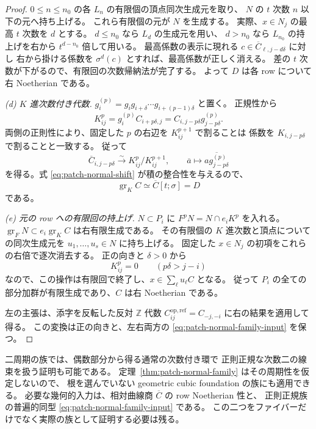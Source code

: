 \begin{proof}
$0\leq n\leq n_0$ の各 $L_n$ の有限個の頂点同次生成元を取り、
$N$ の $t$ 次数 $n$ 以下の元へ持ち上げる。
これら有限個の元が $N$ を生成する。
実際、$x\in N_j$ の最高 $t$ 次数を $d$ とする。
$d\leq n_0$ なら $L_d$ の生成元を用い、
$d>n_0$ なら $L_{n_0}$ の持上げを右から $t^{d-n_0}$ 倍して用いる。
最高係数の表示に現れる $c\in\overline C_{\ell,j-d\delta}$ に対し
右から掛ける係数を $\sigma^d(c)$ とすれば、最高係数が正しく消える。
差の $t$ 次数が下がるので、有限回の次数帰納法が完了する。
よって $D$ は各 row について右 Noetherian である。

\emph{(d) $K$ 進次数付き代数.}
$g_i^{(p)}=g_i g_{i+\delta}\cdots g_{i+(p-1)\delta}$ と置く。
正規性から
\[
 K^p_{ij}=g_i^{(p)}C_{i+p\delta,j}
          =C_{i,j-p\delta}g_{j-p\delta}^{(p)}.
\]
両側の正則性により、固定した $p$ の右辺を $K^{p+1}_{ij}$ で割ることは
係数を $K_{i,j-p\delta}$ で割ることと一致する。
従って
\[
 \overline C_{i,j-p\delta}\xrightarrow{\sim}
 K^p_{ij}/K^{p+1}_{ij},
 \qquad
 \overline a\longmapsto
 \overline{a g_{j-p\delta}^{(p)}}
\]
を得る。式 \eqref{eq:patch-normal-shift} が積の整合性を与えるので、
\[
 \operatorname{gr}_K C\simeq\overline C[t;\sigma]=D
\]
である。

\emph{(e) 元の row への有限回の持上げ.}
$N\subset P_i$ に $F^pN=N\cap e_iK^p$ を入れる。
$\operatorname{gr}_F N\subset e_i\operatorname{gr}_K C$ は右有限生成である。
その有限個の $K$ 進次数と頂点についての同次生成元を
$u_1,\ldots,u_s\in N$ に持ち上げる。
固定した $x\in N_j$ の初項をこれらの右倍で逐次消去する。
正の向きと $\delta>0$ から
\[
 K^p_{ij}=0\qquad(p\delta>j-i)
\]
なので、この操作は有限回で終了し、$x\in\sum_\ell u_\ell C$ となる。
従って $P_i$ の全ての部分加群が有限生成であり、$C$ は右 Noetherian である。

左の主張は、添字を反転した反対 $\mathbb Z$ 代数
$C^{\mathrm{op,ref}}_{ij}=C_{-j,-i}$ に右の結果を適用して得る。
この変換は正の向きと、左右両方の
\eqref{eq:patch-normal-family-input} を保つ。
\end{proof}

\begin{remark}[偶数環による証明との関係]
二周期の族では、偶数部分から得る通常の次数付き環で
正則正規な次数二の線束を扱う証明も可能である。
定理~\ref{thm:patch-normal-family} はその周期性を仮定しないので、
根を選んでいない geometric cubic foundation の族にも適用できる。
必要な幾何的入力は、相対曲線商 $\overline C$ の row Noetherian 性と、
正則正規族の普遍的同型 \eqref{eq:patch-normal-family-input} である。
この二つをファイバーだけでなく実際の族として証明する必要は残る。
\end{remark}

